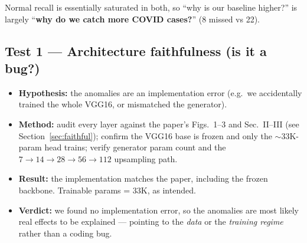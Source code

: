 \documentclass[11pt]{article}
\begin{document}
Normal recall is essentially saturated in both, so ``why is our baseline higher?''
is largely ``\textbf{why do we catch more COVID cases?}'' (8 missed vs 22).

\subsection{Test 1 --- Architecture faithfulness (is it a bug?)}
\begin{itemize}[nosep,leftmargin=1.4em]
  \item \textbf{Hypothesis:} the anomalies are an implementation error (e.g.\ we
        accidentally trained the whole VGG16, or mismatched the generator).
  \item \textbf{Method:} audit every layer against the paper's Figs.~1--3 and
        Sec.~II--III (see Section~\ref{sec:faithful}); confirm the VGG16 base is
        frozen and only the $\sim$33K-param head trains; verify generator param
        count and the $7{\to}14{\to}28{\to}56{\to}112$ upsampling path.
  \item \textbf{Result:} the implementation matches the paper, including the frozen
        backbone. Trainable params = 33K, as intended.
  \item \textbf{Verdict:} we found no implementation error, so the anomalies are
        most likely real effects to be explained --- pointing to the \emph{data} or
        the \emph{training regime} rather than a coding bug.
\end{itemize}
\end{document}
